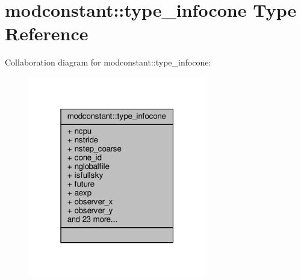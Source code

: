 \hypertarget{structmodconstant_1_1type__infocone}{}\section{modconstant\+:\+:type\+\_\+infocone Type Reference}
\label{structmodconstant_1_1type__infocone}


Collaboration diagram for modconstant\+:\+:type\+\_\+infocone\+:\nopagebreak
\begin{figure}[H]
\begin{center}
\leavevmode
\includegraphics[width=220pt]{structmodconstant_1_1type__infocone__coll__graph}
\end{center}
\end{figure}
